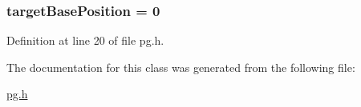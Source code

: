 \subsubsection[{\texorpdfstring{target\+Base\+Position}{targetBasePosition}}]{ target\+Base\+Position = 0}\hypertarget{class_k_1_1_p_g_a41f7e688e22528d01be7373457b533c0}{}\label{class_k_1_1_p_g_a41f7e688e22528d01be7373457b533c0}


Definition at line 20 of file pg.\+h.



The documentation for this class was generated from the following file\+:\begin{DoxyCompactItemize}
\item 
\hyperlink{pg_8h}{pg.\+h}\end{DoxyCompactItemize}
